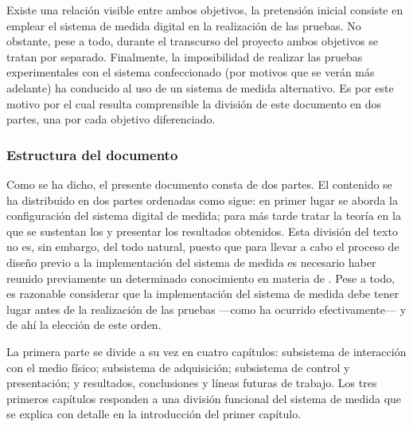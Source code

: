 Existe una relación visible entre ambos objetivos, la pretensión inicial
consiste en emplear el sistema de medida digital en la realización de las
pruebas. No obstante, pese a todo, durante el transcurso del proyecto ambos
objetivos se tratan por separado. Finalmente, la imposibilidad de realizar
las pruebas experimentales con el sistema confeccionado (por motivos que se
verán más adelante) ha conducido al uso de un sistema de medida
alternativo. Es por este motivo por el cual resulta comprensible la
división de este documento en dos partes, una por cada objetivo
diferenciado.


\subsubsection{Estructura del documento}

Como se ha dicho, el presente documento consta de dos partes. El contenido
se ha distribuido en dos partes ordenadas como sigue: en primer lugar se
aborda la configuración del sistema digital de medida; para más tarde
tratar la teoría en la que se sustentan los  y presentar los
resultados obtenidos. Esta división del texto no es, sin embargo, del todo
natural, puesto que para llevar a cabo el proceso de diseño previo a la
implementación del sistema de medida es necesario haber reunido previamente
un determinado conocimiento en materia de . Pese a todo, es
razonable considerar que la implementación del sistema de medida debe tener
lugar antes de la realización de las pruebas ---como ha ocurrido
efectivamente--- y de ahí la elección de este orden.

La primera parte se divide a su vez en cuatro capítulos: subsistema de
interacción con el medio físico; subsistema de adquisición; subsistema de
control y presentación; y resultados, conclusiones y líneas futuras de
trabajo. Los tres primeros capítulos responden a una división funcional del
sistema de medida que se explica con detalle en la introducción del primer
capítulo.


